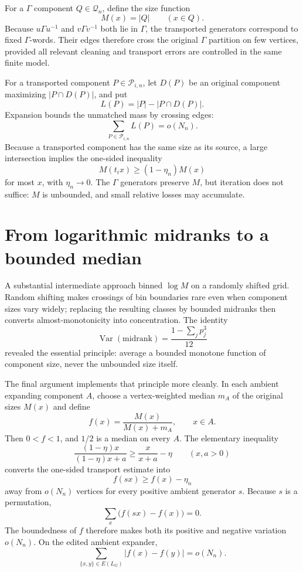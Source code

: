 \documentclass[10pt,openany]{book}
\newcommand{\Var}{\operatorname{Var}}
\begin{document}
For a $\Gamma$ component $Q\in\mathcal{Q}_n$, define the size function
\[
 M(x)=|Q|
 \qquad (x\in Q).
\]
Because $u\Gamma u^{-1}$ and $v\Gamma v^{-1}$ both lie in $\Gamma$, the transported generators correspond to fixed $\Gamma$-words. Their edges therefore cross the original $\Gamma$ partition on few vertices, provided all relevant cleaning and transport errors are controlled in the same finite model.

For a transported component $P\in\mathcal{P}_{i,n}$, let $D(P)$ be an original component maximizing $|P\cap D(P)|$, and put
\[
 L(P)=|P|-|P\cap D(P)|.
\]
Expansion bounds the unmatched mass by crossing edges:
\[
 \sum_{P\in\mathcal{P}_{i,n}}L(P)=o(N_n).
\]
Because a transported component has the same size as its source, a large intersection implies the one-sided inequality
\[
 M(t_i x)\ge (1-\eta_n)M(x)
\]
for most $x$, with $\eta_n\to0$. The $\Gamma$ generators preserve $M$, but iteration does not suffice: $M$ is unbounded, and small relative losses may accumulate.

\section{From logarithmic midranks to a bounded median}

A substantial intermediate approach binned $\log M$ on a randomly shifted grid. Random shifting makes crossings of bin boundaries rare even when component sizes vary widely; replacing the resulting classes by bounded midranks then converts almost-monotonicity into concentration. The identity
\[
 \Var(\text{midrank})=\frac{1-\sum_j p_j^3}{12}
\]
revealed the essential principle: average a bounded monotone function of component size, never the unbounded size itself.

The final argument implements that principle more cleanly. In each ambient expanding component $A$, choose a vertex-weighted median $m_A$ of the original sizes $M(x)$ and define
\[
 f(x)=\frac{M(x)}{M(x)+m_A},
 \qquad
 x\in A.
\]
Then $0<f<1$, and $1/2$ is a median on every $A$. The elementary inequality
\[
 \frac{(1-\eta)x}{(1-\eta)x+a}
 \ge
 \frac{x}{x+a}-\eta
 \qquad (x,a>0)
\]
converts the one-sided transport estimate into
\[
 f(sx)\ge f(x)-\eta_n
\]
away from $o(N_n)$ vertices for every positive ambient generator $s$. Because $s$ is a permutation,
\[
 \sum_x\bigl(f(sx)-f(x)\bigr)=0.
\]
The boundedness of $f$ therefore makes both its positive and negative variation $o(N_n)$. On the edited ambient expander,
\[
 \sum_{\{x,y\}\in E(L_G)}|f(x)-f(y)|=o(N_n).
\]
\end{document}
